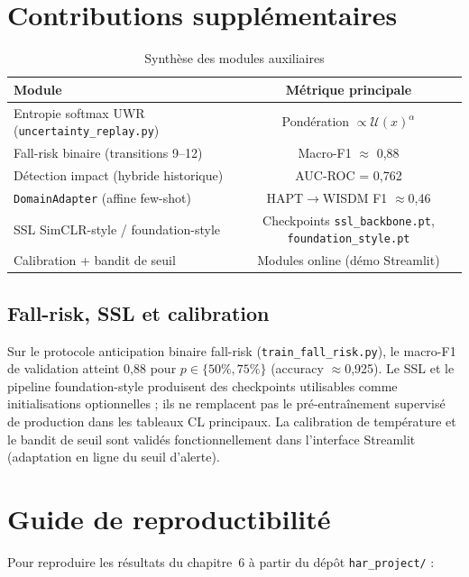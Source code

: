 \documentclass[a4paper,12pt]{report}
\begin{document}
\section{Contributions supplémentaires}

\begin{table}[H]
\centering
\small
\begin{tabularx}{0.75\textwidth}{|Y|c|}
\hline
\textbf{Module} & \textbf{Métrique principale} \\
\hline
Entropie softmax UWR (\texttt{uncertainty\_replay.py}) & Pondération $\propto \mathcal{U}(x)^{\alpha}$ \\
Fall-risk binaire (transitions 9--12)            & Macro-F1 $\approx$ 0,88 \\
Détection impact (hybride historique)            & AUC-ROC = 0,762 \\
\texttt{DomainAdapter} (affine few-shot)              & HAPT$\rightarrow$WISDM F1 $\approx$0,46 \\
SSL SimCLR-style / foundation-style              & Checkpoints \texttt{ssl\_backbone.pt}, \texttt{foundation\_style.pt} \\
Calibration + bandit de seuil                    & Modules online (démo Streamlit) \\
\hline
\end{tabularx}
\caption{Synthèse des modules auxiliaires}
\label{tab:aux_modules}
\end{table}

\subsection{Fall-risk, SSL et calibration}

Sur le protocole anticipation binaire fall-risk
(\texttt{train\_fall\_risk.py}), le macro-F1 de validation atteint 0,88 pour
$p\in\{50\%,75\%\}$ (accuracy $\approx$0,925). Le SSL et le pipeline
foundation-style produisent des checkpoints utilisables comme initialisations
optionnelles ; ils ne remplacent pas le pré-entraînement supervisé de
production dans les tableaux CL principaux. La calibration de température et
le bandit de seuil sont validés fonctionnellement dans l'interface Streamlit
(adaptation en ligne du seuil d'alerte).

\section{Guide de reproductibilité}

Pour reproduire les résultats du chapitre~6 à partir du dépôt \texttt{har\_project/} :
\end{document}
